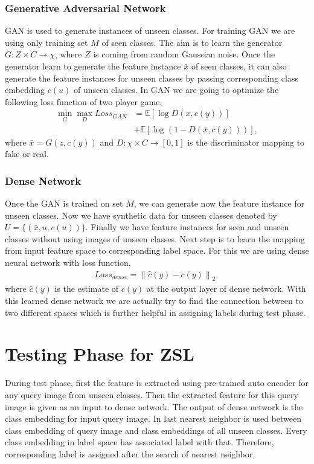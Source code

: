 \documentclass[11pt, conference, english]{IEEEtran}
\theoremstyle{plain}
\theoremstyle{definition}
\theoremstyle{remark}
\newcommand{\eq}[1]{\begin{align*}#1\end{align*}}
\newcommand{\norm}[1]{\left\lVert#1\right\rVert}
\newcommand{\E}{\mathbb{E}}
\begin{document}
	\subsubsection{Generative Adversarial Network } GAN is used to generate instances of unseen classes. For training GAN we are using only training set $M$ of seen classes. The aim is to learn the generator $G:Z \times C \rightarrow \chi$, where $Z$ is coming from random Gaussian noise. Once the generator learn to generate the feature instance $\bar{x}$ of seen classes, it can also generate the feature instances for unseen classes by passing corresponding class embedding $c(u)$ of unseen classes. In GAN we are going to optimize the following loss function of two player game,
	\eq{\min_G \max_D Loss_{GAN}&=\E [\log D(x,c(y))]\\
		&+\E[\log(1-D(\bar{x},c(y)))],}
	where $\bar{x}=G(z,c(y))$ and $D:\chi \times C \rightarrow [0,1]$ is the discriminator mapping to fake or real.
	\subsubsection{Dense Network}
	 Once the GAN is trained on set $M$, we can generate now the feature instance for unseen classes. Now we have synthetic data for unseen classes denoted by 
	$U=\{(\bar{x},u,c(u))\}$. Finally we have feature instances for seen and unseen classes without using images of unseen classes. Next step is to learn the mapping from input feature space to corresponding label space. For this we are using dense neural network with loss function,
	\eq{Loss_{dense}=\norm{\hat{c}(y)-c(y)}_2,} 
	where $\hat{c}(y)$ is the estimate of $c(y)$ at the output layer of dense network. With this learned dense network we are actually try to find the connection between to two different spaces which is further helpful in assigning labels during test phase.
	
	\section{Testing Phase for ZSL}
	During test phase, first the feature is extracted using pre-trained auto encoder for any query image from unseen classes. Then the extracted feature for this query image is given as an input to dense network. The output of dense network is the class embedding for input query image. In last  nearest neighbor is used between class embedding of query image and class embeddings of all unseen classes. Every class embedding in label space has associated label with that. Therefore, corresponding label is assigned after the search of nearest neighbor.
\end{document}
